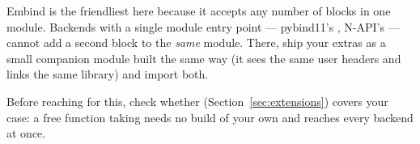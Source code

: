 \begin{warn}
Embind is the friendliest here because it accepts any number of
 blocks in one module. Backends with a single module
entry point --- pybind11's , N-API's
 --- cannot add a second block to the \emph{same}
module. There, ship your extras as a small companion module built the same way
(it sees the same user headers and links the same library) and import both.
\end{warn}

Before reaching for this, check whether 
(Section~\ref{sec:extensions}) covers your case: a free function taking
 needs no build of your own and reaches every backend at once.
